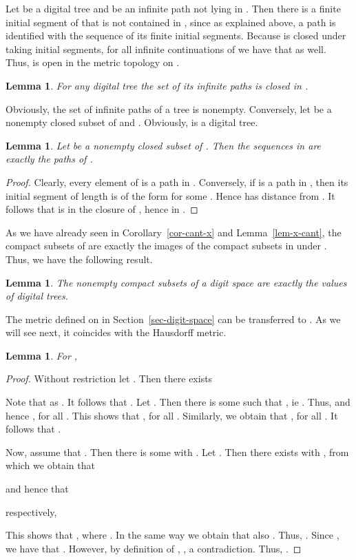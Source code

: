 \documentclass[microtype]{jloganal}
\theoremstyle{plain}
\newtheorem{lemma}[theorem]{Lemma}
\theoremstyle{definition}
\begin{document}
Let  be a digital tree and  be an infinite path not lying in . Then there is a finite initial segment  of  that is not contained in , since as explained above, a path is identified with the sequence of its finite initial segments. Because  is closed under taking initial segments, for all infinite continuations  of  we have that  as well. Thus,  is open in the metric topology on .

\begin{lemma} \label{lem-treecl}
For any digital tree the set of its infinite paths is closed in .
\end{lemma}

Obviously, the set of infinite paths of a tree is nonempty. Conversely, let  be a nonempty closed subset of  and . Obviously,  is a digital tree. 


\begin{lemma}
Let  be a nonempty closed subset of . Then the sequences in  are exactly the paths of .
\end{lemma}
\begin{proof}
Clearly, every element of  is a path in . Conversely, if  is 
a path in , then its initial segment of length  is of the form 
 for some . Hence  has distance 
 from . It follows that  is in the closure of ,
hence in .
\end{proof}

As we have already seen in Corollary~\ref{cor-cant-x} and Lemma~\ref{lem-x-cant}, the compact subsets of  are exactly the images of the compact subsets in  under . Thus, we have the following result.

\begin{lemma}
\label{lem-tree-compact}
The nonempty compact subsets of a digit space  are exactly
the values of digital trees.
\end{lemma}

The metric defined on  in Section~\ref{sec-digit-space} can be transferred to . As we will see next, it coincides with the Hausdorff metric.

\begin{lemma}\label{lem-treehausd}
For ,

\end{lemma}
\begin{proof}
Without restriction let .  Then there exists 

Note that  as . It follows that . Let . Then there is some  such that , ie . Thus,  and hence , for all . This shows that , for all . Similarly, we obtain that , for all . It follows that .

Now, assume that . Then there is some  with . Let . Then there exists  with , from which we obtain that

and hence that

respectively, 

This shows that , where . In the same way we obtain that also . Thus, . Since , we have that . However, by definition of , ,  a contradiction. Thus, .
\end{proof}
\end{document}
